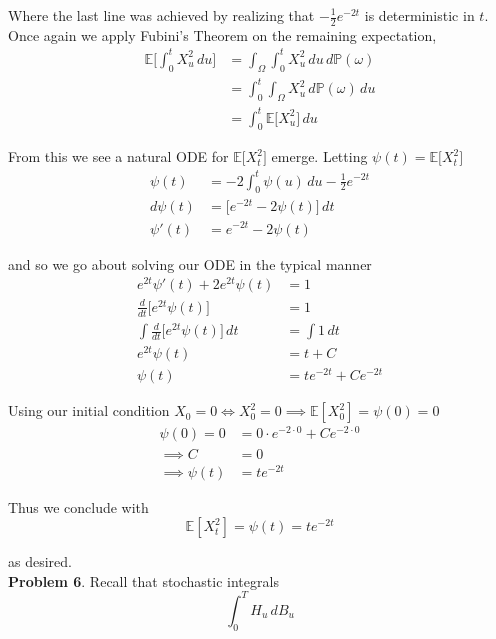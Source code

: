 \documentclass[12pt]{article}
\newlength\tindent
\renewcommand{\indent}{\hspace*{\tindent}}
\begin{document}
\indent Where the last line was achieved by realizing that $-\frac{1}{2}e^{-2t}$ is deterministic in $t$. Once again we apply Fubini's Theorem on the remaining expectation,
\begin{align*}
	\mathbb E\Bigg[\int^t_0 X^2_u \,du\Bigg] &= \int_\Omega\int^t_0 X^2_u\,du\,d\mathbb P(\omega) \\
	&= \int^t_0 \int_\Omega X_u^2 \,d\mathbb P(\omega)\,du \\
	&= \int^t_0 \mathbb E\Big[X_u^2 \Big]\,du
\end{align*}

From this we see a natural ODE for $\mathbb E\big[X_t^2\big]$ emerge. Letting $\psi(t) = \mathbb E\big[X_t^2\big]$ 
\begin{align*}
	\psi(t) &= -2\int^t_0\psi(u)\,du - \frac{1}{2}e^{-2t}\\
	d\psi(t) &= \big[e^{-2t} - 2\psi(t)\big]\,dt \\
	\psi'(t) &= e^{-2t} - 2\psi(t)
\end{align*}

and so we go about solving our ODE in the typical manner
\begin{align*}
	e^{2t}\psi'(t) + 2e^{2t}\psi(t) &= 1 \\
	\frac{d}{dt}\Big[e^{2t}\psi(t)\Big] &= 1 \\
	\int \frac{d}{dt}\Big[e^{2t}\psi(t)\Big]\,dt &= \int 1\,dt \\
	e^{2t}\psi(t) &= t + C \\
	\psi(t) &= te^{-2t} + Ce^{-2t}
\end{align*}

Using our initial condition $X_0 = 0 \iff X_0^2 = 0 \implies \mathbb E[X^2_0] = \psi(0) = 0$
\begin{align*}
	\psi(0) = 0 &= 0\cdot e^{-2\cdot0} + Ce^{-2\cdot 0} \\
	\implies C &= 0 \\
	\implies \psi(t) &= te^{-2t}
\end{align*}

Thus we conclude with
\begin{equation*}
	\mathbb E[X_t^2] = \psi(t) = te^{-2t} 
\end{equation*}

as desired. \\

{\bf Problem 6}. Recall that stochastic integrals
\begin{equation*}
	\int^T_0 H_u\,dB_u
\end{equation*}
\end{document}
